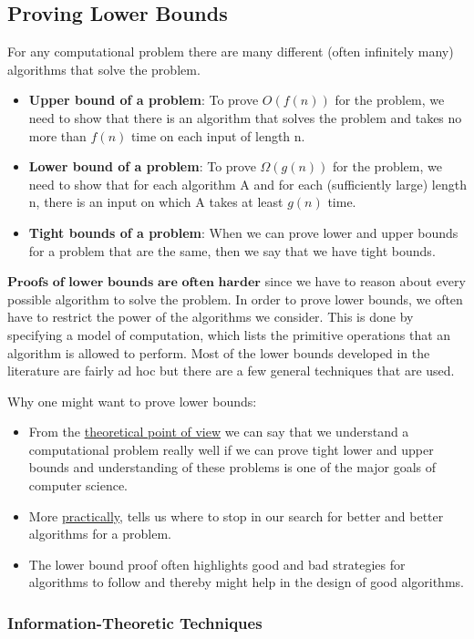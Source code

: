\documentclass[en,hazy,blue,screen,14pt]{elegantnote}
\begin{document}
\subsection{Proving Lower Bounds}

For any computational problem there are many different (often infinitely
many) algorithms that solve the problem. 
\begin{itemize}
\item \textbf{Upper bound of a problem}: To prove $O(f(n))$  for the problem,
we need to show that there is an algorithm that solves the problem
and takes no more than $f(n)$ time on each input of length n.
\item \textbf{Lower bound of a problem}: To prove $\Omega(g(n))$  for
the problem, we need to show that for each algorithm A and for each
(sufficiently large) length n, there is an input on which A takes
at least $g(n)$ time.
\item \textbf{Tight bounds of a problem}: When we can prove lower and upper
bounds for a problem that are the same, then we say that we have tight
bounds.
\end{itemize}
$\textbf{Proofs of lower bounds are often harder}$ since we have to
reason about every possible algorithm to solve the problem. In order
to prove lower bounds, we often have to restrict the power of the
algorithms we consider. This is done by specifying a model of computation,
which lists the primitive operations that an algorithm is allowed
to perform. Most of the lower bounds developed in the literature are
fairly ad hoc but there are a few general techniques that are used.

Why one might want to prove lower bounds:
\begin{itemize}
\item From the \uline{theoretical point of view} we can say that we understand
a computational problem really well if we can prove tight lower and
upper bounds and understanding of these problems is one of the major
goals of computer science. 
\item More \uline{practically}, tells us where to stop in our search
for better and better algorithms for a problem. 
\item The lower bound proof often highlights good and bad strategies for
algorithms to follow and thereby might help in the design of good
algorithms. 
\end{itemize}

\subsubsection*{Information-Theoretic Techniques}
\end{document}
